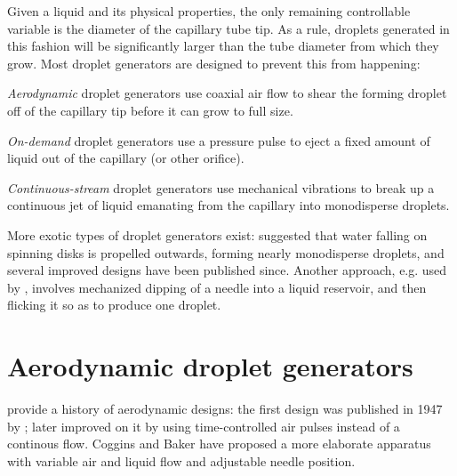 \documentclass[11.5pt]{book}
\begin{document}
Given a liquid and its physical properties, the only remaining controllable
variable is the diameter of the capillary tube tip. As a rule, droplets
generated in this fashion will be significantly larger than the tube diameter
from which they grow. Most droplet generators are designed to prevent this from
happening:
\begin{alist}
\item \emph{Aerodynamic} droplet generators use coaxial air flow to shear the
    forming droplet off of the capillary tip before it can grow to full size.
\item \emph{On-demand} droplet generators use a pressure pulse to eject a fixed
    amount of liquid out of the capillary (or other orifice).
\item \emph{Continuous-stream} droplet generators use mechanical vibrations to
    break up a continuous jet of liquid emanating from the capillary into
    monodisperse droplets.
\end{alist}
More exotic types of droplet generators exist: \citet{Walton49} suggested that
water falling on spinning disks is propelled outwards, forming nearly
monodisperse droplets, and several improved designs have been published since.
Another approach, e.g. used by \citet{Merritt77}, involves mechanized dipping of
a needle into a liquid reservoir, and then flicking it so as to produce one
droplet.

\section{Aerodynamic droplet generators}
\citet{Allan88} provide a history of aerodynamic designs: the first design was
published in 1947 by \citet{Lane47}; \citet{Reil69} later improved on it by
using time-controlled air pulses instead of a continous flow. Coggins and Baker
\cite{Coggins83} have proposed a more elaborate apparatus with variable air and liquid
flow and adjustable needle position.
\end{document}
